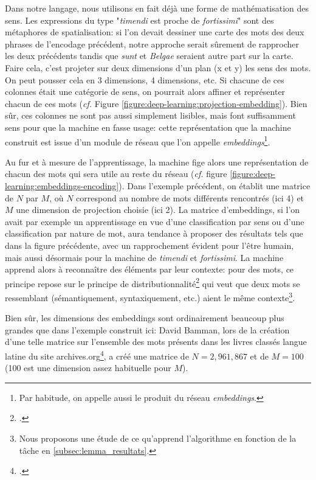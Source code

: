 Dans notre langage, nous utilisons en fait déjà une forme de mathématisation des sens. Les expressions du type "\textit{timendi} est proche de \textit{fortissimi}" sont des métaphores de spatialisation: si l'on devait dessiner une carte des mots des deux phrases de l'encodage précédent, notre approche serait sûrement de rapprocher les deux précédents tandis que \textit{sunt} et \textit{Belgae} seraient autre part sur la carte. Faire cela, c'est projeter sur deux dimensions d'un plan (x et y) les sens des mots. On peut pousser cela en 3 dimensions, 4 dimensions, etc. Si chacune de ces colonnes était une catégorie de sens, on pourrait alors affiner et représenter chacun de ces mots (\textit{cf.} Figure \ref{figure:deep-learning:projection-embedding}). Bien sûr, ces colonnes ne sont pas aussi simplement lisibles, mais font suffisamment sens pour que la machine en fasse usage: cette représentation que la machine construit est issue d'un module de réseau que l'on appelle \textit{embeddings}\footnote{Par habitude, on appelle aussi le produit du réseau \textit{embeddings}.}. 

Au fur et à mesure de l'apprentissage, la machine fige alors une représentation de chacun des mots qui sera utile au reste du réseau (\textit{cf.} figure \ref{figure:deep-learning:embeddings-encoding}). Dans l'exemple précédent, on établit une matrice de $N$ par $M$, où $N$ correspond au nombre de mots différents rencontrés (ici 4) et $M$ une dimension de projection choisie (ici 2). La matrice d'embeddings, si l'on avait par exemple un apprentissage en vue d'une classification par sens ou d'une classification par nature de mot, aura tendance à proposer des résultats tels que dans la figure précédente, avec un rapprochement évident pour l'être humain, mais aussi désormais pour la machine de \textit{timendi} et \textit{fortissimi}. La machine apprend alors à reconnaître des éléments par leur contexte: pour des mots, ce principe repose sur le principe de distributionnalité\footcite{firth_papers_1957} qui veut que deux mots se ressemblant (sémantiquement, syntaxiquement, etc.) aient le même contexte\footnote{Nous proposons une étude de ce qu'apprend l'algorithme en fonction de la tâche en \ref{subsec:lemma_resultats}.}.







Bien sûr, les dimensions des embeddings sont ordinairement beaucoup plus grandes que dans l'exemple construit ici: David Bamman, lors de la création d'une telle matrice sur l'ensemble des mots présents dans les livres classés langue latine du site archives.org\footcite{bamman_11k_2012}, a créé une matrice de $N=2,961,867$ et de $M=100$ (100 est une dimension assez habituelle pour $M$). 

